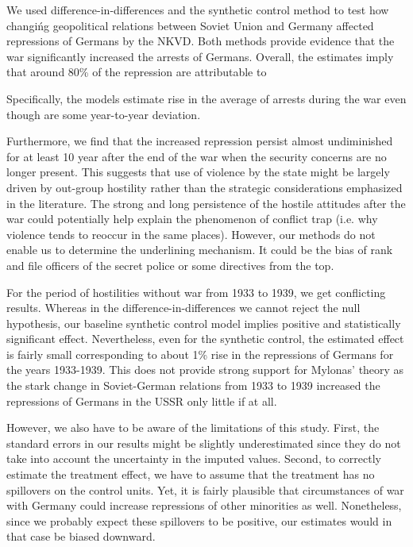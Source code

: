 We used difference-in-differences and the synthetic control method to test how changińg geopolitical relations between Soviet Union and Germany  affected repressions of Germans by the NKVD. 
Both methods provide evidence that the war significantly increased the arrests of Germans.
Overall, the estimates imply that around 80\% of the repression are attributable to 

Specifically, the models estimate  rise in the average of arrests during the war even though are some year-to-year deviation. 

Furthermore, we find that the increased repression persist almost undiminished for at least 10 year after the end of the war when the security concerns are no longer present.
This  suggests that use of violence by the state might be largely driven by out-group 
hostility rather than the strategic considerations emphasized in the literature. 
The strong and long persistence of the hostile attitudes after the war could potentially help explain the phenomenon of conflict trap (i.e. why violence tends to reoccur in the same places). 
However, our methods do not enable us to determine the underlining mechanism. It could be the bias of  rank and file officers of the secret police or some  directives from the top. %

For the period of hostilities without war from 1933 to 1939, we get conflicting results. Whereas in the difference-in-differences we cannot reject the null hypothesis, our baseline synthetic control model implies positive and statistically significant effect. Nevertheless, even for the synthetic control, the estimated effect is fairly small corresponding to about 1\% rise in the repressions of Germans for the years 1933-1939.
This does not provide strong support for Mylonas'  \citeyearpar{mylonas_politics_2013} theory as the stark change in Soviet-German relations from 1933 to 1939 increased the repressions of Germans in the USSR only little if at all. 

However, we also  have to be aware of the limitations of this study. 
First, the standard errors in our results might be slightly underestimated  since they do not take into account the uncertainty in the imputed values. 
Second, to correctly estimate the treatment effect, we have to assume that the treatment has no spillovers on the control units. Yet, it is fairly plausible that circumstances of war with Germany could increase repressions of other minorities as well.
Nonetheless, since we probably expect these spillovers  to be positive, our estimates would in that case be biased downward.

